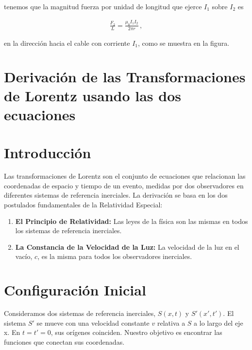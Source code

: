 \documentclass[11pt,a4paper]{book}
\begin{document}
\begin{minipage}{\mipa}
tenemos que la magnitud fuerza por unidad de longitud que ejerce $I_1$ sobre $I_2$ es
\end{minipage}

\begin{align*}
    \frac{F_2}{L} = \frac{\mu_0 I_1 I_2}{2\pi r}\,,
\end{align*}

\begin{minipage}{\mipa}
en la dirección hacia el cable con corriente $I_1$, como se muestra en la figura.
\end{minipage}



\section*{Derivación de las Transformaciones de Lorentz usando las dos ecuaciones}

\section*{Introducción}

Las transformaciones de Lorentz son el conjunto de ecuaciones que relacionan las coordenadas de espacio y tiempo de un evento, medidas por dos observadores en diferentes sistemas de referencia inerciales. La derivación se basa en los dos postulados fundamentales de la Relatividad Especial:
\begin{enumerate}
    \item \textbf{El Principio de Relatividad:} Las leyes de la física son las mismas en todos los sistemas de referencia inerciales.
    \item \textbf{La Constancia de la Velocidad de la Luz:} La velocidad de la luz en el vacío, $c$, es la misma para todos los observadores inerciales.
\end{enumerate}

\section*{Configuración Inicial}
Consideramos dos sistemas de referencia inerciales, $S(x,t)$ y $S'(x',t')$. El sistema $S'$ se mueve con una velocidad constante $v$ relativa a $S$ a lo largo del eje x. En $t=t'=0$, sus orígenes coinciden. Nuestro objetivo es encontrar las funciones que conectan sus coordenadas.
\end{document}
